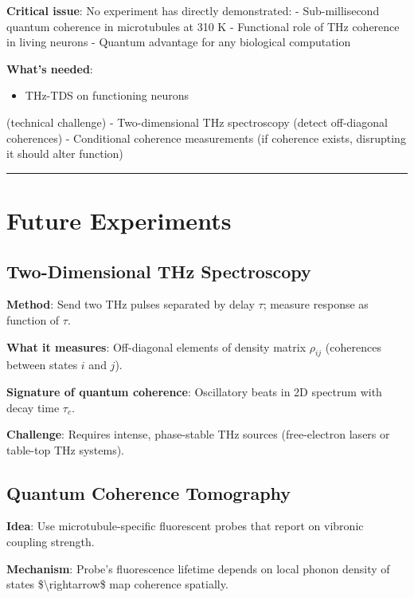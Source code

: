 \textbf{Critical issue}: No experiment has directly demonstrated: -
Sub-millisecond quantum coherence in microtubules at 310 K - Functional
role of THz coherence in living neurons - Quantum advantage for any
biological computation

\textbf{What's needed}:
\begin{itemize}
\item THz-TDS on functioning neurons
\end{itemize}

(technical challenge) - Two-dimensional THz spectroscopy (detect
off-diagonal coherences) - Conditional coherence measurements (if
coherence exists, disrupting it should alter function)

\begin{center}\rule{0.5\linewidth}{0.5pt}\end{center}

\section{Future Experiments}\label{future-experiments}

\subsection{Two-Dimensional THz
Spectroscopy}\label{two-dimensional-thz-spectroscopy}

\textbf{Method}: Send two THz pulses separated by delay \(\tau\);
measure response as function of \(\tau\).

\textbf{What it measures}: Off-diagonal elements of density matrix
\(\rho_{ij}\) (coherences between states \(i\) and \(j\)).

\textbf{Signature of quantum coherence}: Oscillatory beats in 2D
spectrum with decay time \(\tau_c\).

\textbf{Challenge}: Requires intense, phase-stable THz sources
(free-electron lasers or table-top THz systems).

\subsection{Quantum Coherence
Tomography}\label{quantum-coherence-tomography}

\textbf{Idea}: Use microtubule-specific fluorescent probes that report
on vibronic coupling strength.

\textbf{Mechanism}: Probe's fluorescence lifetime
depends on local phonon density of states \$\textbackslash rightarrow\$
map coherence spatially.

